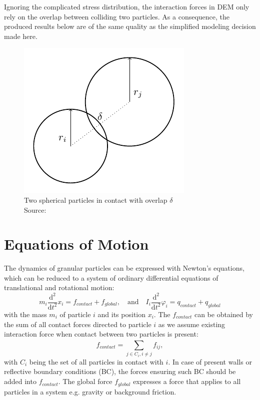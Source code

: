 \documentclass[11pt,
               a4paper,
               bibtotoc,
               idxtotoc,
               headsepline,
               footsepline,
               footexclude,
               BCOR12mm,
               DIV13,
               openany,   %
               ]
               {scrbook}
\begin{document}
Ignoring the complicated stress distribution, the interaction forces in DEM only rely on the overlap between colliding two particles. As a consequence, the produced results below are of the same quality as the simplified modeling decision made here. 

 \begin{figure}[H] %
	\centering
	\includegraphics[width=.3\columnwidth]{figures/discrete_spherical_particle_model.pdf}
	\caption[Example Figure]{Two spherical particles in contact with overlap $\delta$ \\
		\tiny{Source: \cite{Luding2008}}}
	\label{fig:discrete_spherical_particle_model} %
\end{figure}

\chapter{Equations of Motion}
The dynamics of granular particles can be expressed with Newton's equations, which can be reduced to a system of ordinary differential equations of translational and rotational  motion:
\begin{equation}
	m_i \frac{\mathrm{d}^2}{\mathrm{d}t^2} x_i = f_{contact} + f_{global}, \quad \text{and} \quad
	I_i \frac{\mathrm{d}^2}{\mathrm{d}t^2} \varphi_i = q_{contact} + q_{global}
	\label{equations_of_motion}
\end{equation}
with the mass $m_i$  of particle $i$ and its position $x_i$. The $f_{contact}$ can be obtained by the sum of all contact forces directed to particle $i$ as we assume existing interaction force when contact between two particles is present:
\begin{equation}
f_{contact} = \sum_{j \in C_{i}, i \neq j}^{} f_{ij},
\end{equation}
with $C_i$ being the set of all particles in contact with $i$. In case of present walls or reflective boundary conditions (BC), the forces ensuring such BC should be added into $f_{contact}$.
The global force $f_{global}$ expresses a force that applies to all particles in a system e.g. gravity or background friction.
\end{document}
